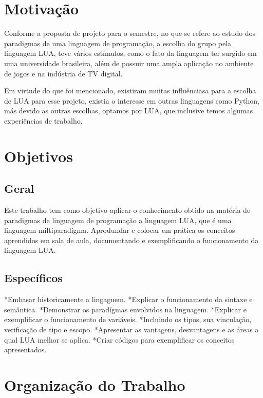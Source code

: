 \documentclass[
	12pt,				%
	openright,			%
	twoside,			%
	a4paper,			%
	english,			%
	brazil,				%
	]{abntex2}
\begin{document}
\section{Motivação}
Conforme a proposta de projeto para o semestre, no que se refere ao estudo dos paradigmas de uma linguagem de programação, a escolha do grupo pela linguagem LUA, teve vários estímulos, como o fato da linguagem ter surgido em uma universidade brasileira, além de possuir uma ampla aplicação no ambiente de jogos e na indústria de TV digital.

Em virtude do que foi mencionado, existiram muitas influênciasa para a escolha de LUA para esse projeto, existia o interesse em outras linguagens como Python, más devido as outras escolhas, optamos por LUA, que inclusive temos algumas experiências de trabalho.

\section{Objetivos}

\subsection{Geral}
Este trabalho tem como objetivo aplicar o conhecimento obtido na matéria de paradigmas de linguagem de programação a linguagem LUA, que é uma linguagem miltiparadígma. Aprodundar e colocar em prática os conceitos aprendidos em sala de aula, documentando e exemplificando o funcionamento da linguagem LUA.

\subsection{Específicos}
*Embasar historicamente a lingaguem.
*Explicar o funcionamento da sintaxe e semântica.
*Demonstrar os paradígmas envolvidos na linguagem.
*Explicar e exemplificar o funcionamento de variáveis.
	*Incluindo os tipos, sua vinculação, verificação de tipo e escopo.
*Apresentar as vantagens, desvantagens e as áreas a qual LUA melhor se aplica.
*Criar códigos para exemplificar os conceitos apresentados.
\section{Organização do Trabalho}


\end{document}
